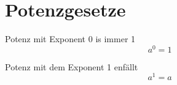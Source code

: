 \documentclass[11pt]{article}
\begin{document}
\section{Potenzgesetze}


Potenz mit Exponent 0 is immer 1
$$ a^{0} = 1 $$

Potenz mit dem Exponent 1 enfällt
$$ a^{1} = a $$ 
\end{document}
